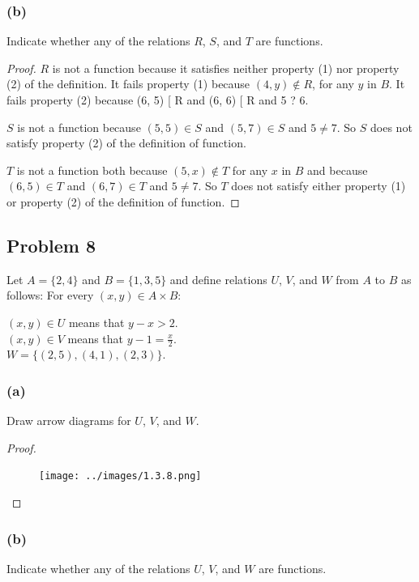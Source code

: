 \documentclass[14pt]{extarticle}
\begin{document}
\subsubsection{(b)}
Indicate whether any of the relations $R$, $S$, and $T$ are functions.

\begin{proof}
$R$ is not a function because it satisfies neither property (1) nor property (2)
of the definition. It fails property (1) because $(4, y) \notin R$, for any $y$
in $B$. It fails property (2) because (6, 5) [ R and (6, 6) [ R and 5 ? 6.

$S$ is not a function because $(5, 5) \in S$ and $(5, 7) \in S$ and
$5 \neq 7$. So $S$ does not satisfy property (2) of the definition of function.

$T$ is not a function both because $(5, x) \notin T$ for any $x$ in $B$ and
because $(6, 5) \in T$ and $(6, 7) \in T$ and $5 \neq 7$. So $T$ does not
satisfy either property (1) or property (2) of the definition of function.
\end{proof}

\subsection{Problem 8}
Let $A = \{2, 4\}$ and $B = \{1, 3, 5\}$ and define relations $U$, $V$, and
$W$ from $A$ to $B$ as follows: For every $(x, y) \in A \times B$:
\begin{center}
$(x, y) \in U$ means that $y - x > 2$.\\
$(x, y) \in V$ means that $y - 1 = \frac{x}{2}$.\\
$W = \{(2, 5), (4, 1), (2, 3)\}$.
\end{center}

\subsubsection{(a)}
Draw arrow diagrams for $U$, $V$, and $W$.

\begin{proof}
\begin{figure}[ht!]
\centering
\texttt{[image: ../images/1.3.8.png]}
\end{figure}
\end{proof}

\subsubsection{(b)}
Indicate whether any of the relations $U$, $V$, and $W$ are functions.
\end{document}
